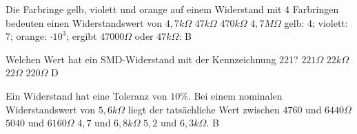 
{Die Farbringe gelb, violett und orange auf einem Widerstand mit 4 Farbringen bedeuten einen Widerstandswert von}%
{$4,7k\Omega$}%
{$47k\Omega$}%
{$470k\Omega$}%
{$4,7M\Omega$}%
{gelb: 4; violett: 7; orange: $\cdot 10^3$; ergibt $47000\Omega$ oder $47k\Omega$: B}%

{Welchen Wert hat ein SMD-Widerstand mit der Kennzeichnung 221?}%
{$221\Omega$}%
{$22k\Omega$}%
{$22\Omega$}%
{$220\Omega$}%
{D}%

{Ein Widerstand hat eine Toleranz von $10 \%$. Bei einem nominalen Widerstandswert von $5,6 k\Omega$ liegt der tatsächliche Wert zwischen}%
{$4760$ und $6440 \Omega$}%
{$5040$ und $6160 \Omega$}%
{$4,7$ und $6,8 k\Omega$}%
{$5,2$ und $6,3 k\Omega.$}%
{B}%

